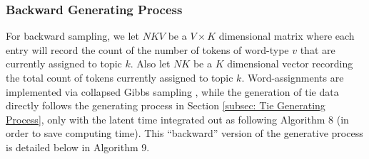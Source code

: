 \documentclass[a4paper]{article}
\begin{document}
            \subsubsection{Backward Generating Process} \label{subsubsec: Backward Generative Process}
        For backward sampling, we let $NKV$ be a $V\times K$ dimensional matrix where each entry will record the count of the number of tokens of word-type $v$ that are currently assigned to topic $k$. Also let $NK$ be a $K$ dimensional vector recording the total count of tokens currently assigned to topic $k$. Word-assignments are implemented via collapsed Gibbs sampling \citep{griffiths2002gibbs}, while the generation of tie data directly follows the generating process in Section \ref{subsec: Tie Generating Process}, only with the latent time integrated out as following Algorithm 8 (in order to save computing time). This “backward” version of the generative process is detailed below in Algorithm 9.
\end{document}
